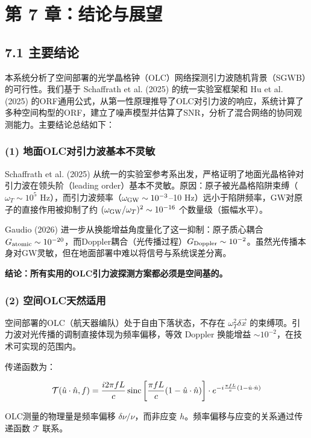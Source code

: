 \documentclass[12pt,a4paper]{article}
\begin{document}
\section{第 7 章：结论与展望}


\subsection{7.1 主要结论}


本系统分析了空间部署的光学晶格钟（OLC）网络探测引力波随机背景（SGWB）的可行性。我们基于 Schaffrath et al. (2025) 的统一实验室框架和 Hu et al. (2025) 的ORF通用公式，从第一性原理推导了OLC对引力波的响应，系统计算了多种空间构型的ORF，建立了噪声模型并估算了SNR，分析了混合网络的协同观测能力。主要结论总结如下：

\subsubsection{(1) 地面OLC对引力波基本不灵敏}


Schaffrath et al. (2025) 从统一的实验室参考系出发，严格证明了地面光晶格钟对引力波在领头阶（leading order）基本不灵敏。原因：原子被光晶格陷阱束缚（$\omega_T \sim 10^5$ Hz），而引力波频率（$\omega_{\rm GW} \sim 10^{-3}$–10 Hz）远小于陷阱频率，GW对原子的直接作用被抑制了约 $(\omega_{\rm GW}/\omega_T)^2 \sim 10^{-16}$ 个数量级（振幅水平）。

Gaudio (2026) 进一步从换能增益角度量化了这一抑制：原子质心耦合 $G_{\rm atomic} \sim 10^{-20}$，而Doppler耦合（光传播过程）$G_{\rm Doppler} \sim 10^{-2}$。虽然光传播本身对GW灵敏，但在地面部署中难以将信号与系统误差分离。

\textbf{结论：所有实用的OLC引力波探测方案都必须是空间基的。}

\subsubsection{(2) 空间OLC天然适用}


空间部署的OLC（航天器编队）处于自由下落状态，不存在 $\omega_T^2 \delta \vec{x}$ 的束缚项。引力波对光传播的调制直接体现为频率偏移，等效 Doppler 换能增益 $\sim 10^{-2}$，在技术可实现的范围内。

传递函数为：

$$\mathcal{T}(\hat{u}\cdot\hat{n}, f) = \frac{i2\pi f L}{c}\, {\rm sinc}\left[\frac{\pi f L}{c}(1 - \hat{u}\cdot\hat{n})\right] \cdot e^{-i\frac{\pi f L}{c}(1 - \hat{u}\cdot\hat{n})}$$

OLC测量的物理量是频率偏移 $\delta\nu/\nu$，而非应变 $h$。频率偏移与应变的关系通过传递函数 $\mathcal{T}$ 联系。
\end{document}
